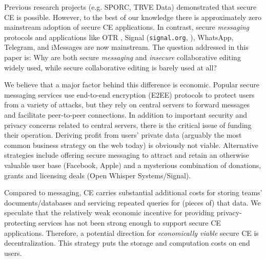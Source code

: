 \documentclass[runningheads]{llncs}
\begin{document}
Previous research projects (e.g. SPORC\cite{Feldman2010}, TRVE Data\cite{Kleppmann2018}) demonstrated that secure CE is possible.
However, to the best of our knowledge there is approximately zero mainstream adoption of secure CE applications.
In contrast, secure \emph{messaging} protocols and applications like OTR \cite{Borisov2004}, Signal (\texttt{signal.org}, \cite{Cohn-Gordon2018}), WhatsApp, Telegram, and iMessages are now mainstream.
The question addressed in this paper is: Why are both secure \emph{messaging} and \emph{insecure} collaborative editing widely used, while secure collaborative editing is barely used at all?\footnotemark{}


We believe that a major factor behind this difference is economic.
Popular secure messaging services use end-to-end encryption (E2EE) protocols to protect users from a variety of attacks, but they rely on central servers to forward messages and facilitate peer-to-peer connections.
In addition to important security and privacy concerns related to central servers, there is the critical issue of funding their operation.
Deriving profit from users' private data (arguably the most common business strategy on the web today) is obviously not viable.
Alternative strategies include offering secure messaging to attract and retain an otherwise valuable user base (Facebook, Apple) and a mysterious combination of donations, grants and licensing deals (Open Whisper Systems{\slash}Signal).

Compared to messaging, CE carries substantial additional costs for storing teams' documents{\slash}databases and servicing repeated queries for (pieces of) that data.
We speculate that the relatively weak economic incentive for providing privacy-protecting services has not been strong enough to support secure CE applications.
Therefore, a potential direction for \emph{economically viable} secure CE is decentralization.
This strategy puts the storage and computation costs on end users.\footnotemark{}

\end{document}
